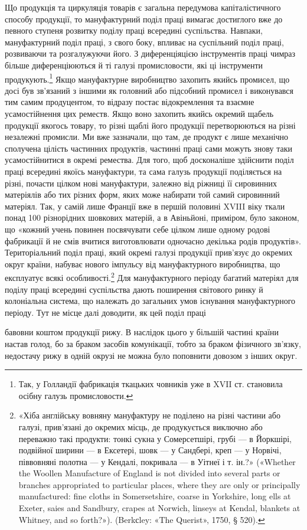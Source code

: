 Що продукція та циркуляція товарів є загальна передумова
капіталістичного способу продукції, то мануфактурний поділ
праці вимагає достиглого вже до певного ступеня розвитку поділу
праці всередині суспільства. Навпаки, мануфактурний поділ
праці, з свого боку, впливає на суспільний поділ праці, розвиваючи
та розгалужуючи його. З диференціяцією інструментів
праці чимраз більше диференціюються й ті галузі промисловости,
які ці інструменти продукують.\footnote{
Так, у Голландії фабрикація ткацьких човників уже в XVII ст.
становила осібну галузь промисловости.
} Якщо мануфактурне виробництво
захопить якийсь промисел, що досі був зв’язаний з іншими
як головний або підсобний промисел і виконувався тим самим
продуцентом, то відразу постає відокремлення та взаємне усамостійнення
цих реместв. Якщо воно захопить якийсь окремий
щабель продукції якогось товару, то різні щаблі його продукції
перетворюються на різні незалежні промисли. Ми вже зазначали,
що там, де продукт є лише механічно сполучена цілість частинних
продуктів, частинні праці сами можуть знову таки усамостійнитися
в окремі ремества. Для того, щоб досконаліше здійснити
поділ праці всередині якоїсь мануфактури, та сама галузь
продукції поділяється на різні, почасти цілком нові мануфактури,
залежно від ріжниці її сировинних матеріялів або тих різних
форм, яких може набирати той самий сировинний матеріял.
Так, у самій лише Франції вже в першій половині XVIII віку
ткали понад 100 різнорідних шовкових матерій, а в Авіньйоні,
приміром, було законом, що «кожний учень повинен посвячувати
себе цілком лише одному родові фабрикації й не смів вчитися
виготовлювати одночасно декілька родів продуктів». Територіальний
поділ праці, який окремі галузі продукції прив’язує
до окремих округ країни, набуває нового імпульсу від мануфактурного
виробництва, що експлуатує всякі особливості.\footnote{
«Хіба англійську вовняну мануфактуру не поділено на різні
частини або галузі, прив’язані до окремих місць, де продукується виключно
або переважно такі продукти: тонкі сукна у Сомерсетшірі, грубі —
в Йоркшірі, подвійної ширини — в Ексетері, шовк — у Сандбері, креп —
у Норвічі, піввовняні полотна — у Кендалі, покривала — в Уітнеї і
т. ін.?» («Whether the Woollen Manufacture of England is not divided
into several parts or branches appropriated to particular places, where
they are only or principally manufactured: fine cloths in Somersetshire,
coarse in Yorkshire, long ells at Exeter, saies and Sandbury, crapes at
Norwich, linseys at Kendal, blankets at Whitney, and so forth?»).
(Berkсley: «The Querist», 1750, § 520).
} Для мануфактурного
періоду багатий матеріял для поділу праці всередині
суспільства дають поширення світового ринку й колоніальна
система, що належать до загальних умов існування мануфактурного
періоду. Тут не місце далі доводити, як цей поділ праці

бавовни коштом продукції рижу. В наслідок цього у більшій частині
країни настав голод, бо за браком засобів комунікації, тобто за браком
фізичного зв'язку, недостачу рижу в одній окрузі не можна було поповнити
довозом з інших округ.
\parbreak{}  %
